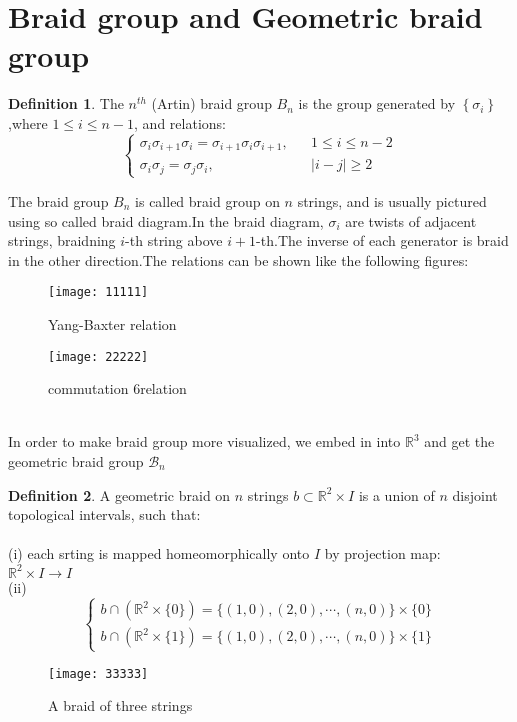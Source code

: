 \documentclass[UTF8]{ctexart}
\theoremstyle{definition}
\newtheorem{definition}{Definition}[section]
\theoremstyle{remark}
\begin{document}
\section{Braid group and Geometric braid group}
\begin{definition}
	The $n^{th}$ (Artin) braid group $B_n$ is the group generated by   $\left\{\sigma_i\right\}$ ,where $1\leq i\leq n-1$, 
	and relations:
	$$\left\{\begin{array}{rcl}
		\sigma_i\sigma_{i+1}\sigma_i=\sigma_{i+1}\sigma_i\sigma_{i+1},&&1\leq i\leq n-2\\\sigma_i\sigma_j=\sigma_j\sigma_i,&&|i-j|\geq 2
		\end{array}\right.$$
	\end{definition}
The braid group $B_n$ is called braid group on $n$ strings, and is usually pictured using so called braid diagram.In the braid diagram, $\sigma_i$ are twists of adjacent strings, braidning $i$-th string above $i+1$-th.The inverse of each generator is braid in the other direction.The relations can be shown like the following figures:
\begin{figure}[h]
\centering
\texttt{[image: 11111]}
\caption{Yang-Baxter relation}
\end{figure}
\begin{figure}[h]
	\centering\texttt{[image: 22222]}
	\caption{commutation 6relation}
\end{figure}
\\In order to make braid group more visualized, we embed in into $\mathbb{R}^3$ and get the geometric braid group $\mathcal{B}_n$ 
\begin{definition}
	A geometric braid on $n$ strings $b\subset \mathbb{R}^2\times I$ is a union of $n$ disjoint topological intervals, such that:\\\\(i) each srting is mapped homeomorphically onto $I$ by projection map:\\$\mathbb{R}^2\times I\rightarrow I$\\(ii)$$\left\{\begin{array}{rcl}
	b\cap(\mathbb{R}^2\times\{0\})=\{(1,0),(2,0),\cdots,(n,0)\}\times\{0\}\\b\cap(\mathbb{R}^2\times\{1\})=\{(1,0),(2,0),\cdots,(n,0)\}\times\{1\}
	\end{array}\right.$$
\end{definition}
\begin{figure}[h]
	\centering
	\texttt{[image: 33333]}
	\caption{A braid of three strings}
\end{figure}
\end{document}
